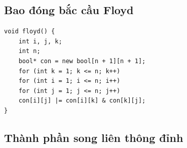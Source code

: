 \documentclass[11pt]{article}
\begin{document}
\subsection{Bao đóng bắc cầu Floyd}

\begingroup
\footnotesize
\begin{verbatim}
void floyd() {
    int i, j, k;
    int n;
    bool* con = new bool[n + 1][n + 1];
    for (int k = 1; k <= n; k++)
    for (int i = 1; i <= n; i++)
    for (int j = 1; j <= n; j++)
    con[i][j] |= con[i][k] & con[k][j];
}
\end{verbatim}
\endgroup

\subsection{Thành phần song liên thông đỉnh}
\end{document}
